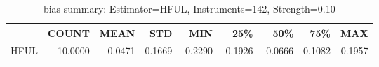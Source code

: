 \begin{table}[ht]
\centering
\caption{bias summary: Estimator=HFUL, Instruments=142, Strength=0.10}
\begin{tabular}{lrrrrrrrr}
\toprule
 & COUNT & MEAN & STD & MIN & 25\% & 50\% & 75\% & MAX \\
\midrule
HFUL & 10.0000 & -0.0471 & 0.1669 & -0.2290 & -0.1926 & -0.0666 & 0.1082 & 0.1957 \\
\bottomrule
\end{tabular}
\end{table}
